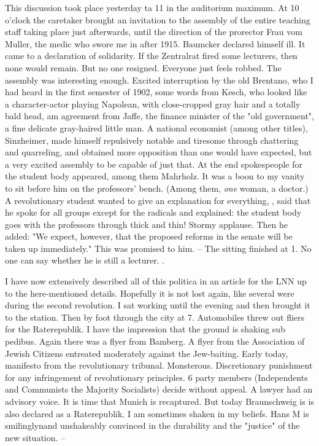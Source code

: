 This discussion took place yesterday ta 11 in the auditorium maximum. At 10 o'clock the caretaker brought an invitation to the assembly of the entire teaching staff taking place just afterwards, until the direction of the prorector Frau vom Muller, the medic who swore me in after 1915. Baumcker declared himself ill. It came to a declaration of solidarity. If the Zentralrat fired some lecturers, then none would remain. But no one resigned. Everyone just feels robbed. The assembly was interesting enough. Excited interruption by the old Brentano, who I had heard in the first semester of 1902, some words from Kesch, who looked like a character-actor playing Napolean, with close-cropped gray hair and a totally bald head, am agreement from Jaffe, the finance minister of the "old government", a fine delicate gray-haired little man. A national economist (among other titles), Sinzheimer, made himself repulsively notable and tiresome through chattering and quarreling, and obtained more opposition than one would have expected, but a very excited assembly to be capable of just that. At the end spokespeople for the student body appeared, among them Mahrholz. It was a boon to my vanity to sit before him on the professors' bench. (Among them, \textit{one} woman, a doctor.) A revolutionary student wanted to give an explanation for everything, , said that he spoke for all groups except for the radicals and explained: the student body goes with the professors through thick and thin! Stormy applause. Then he added: "We expect, however, that the proposed reforms in the senate will be taken up immediately." This was promised to him. -- The sitting finished at 1. No one can say whether he is still a lecturer. .

I have now extensively described all of this politica in an article for the LNN up to the here-mentioned details. Hopefully it is not lost again, like several were during the second revolution. I sat working until the evening and then brought it to the station. Then by foot through the city at 7. Automobiles threw out fliers for the Raterepublik. I have the impression that the ground is shaking sub pedibus. Again there was a flyer from Bamberg. A flyer from the Association of Jewish Citizens entreated moderately against the Jew-baiting. Early today, manifesto from the revolutionary tribunal. Monsterous. Discretionary punishment for any infringement of revolutionary principles. 6 party members (Independents and Communists  the Majority Socialists) decide without appeal. A lawyer had an advisory voice. It is time that Munich is recaptured. But today Braunschweig is is also declared as a Raterepublik. I am sometimes shaken in my beliefs. Hans M is smilinglynand unshakeably convinced in the durability and the "justice" of the new situation. --

